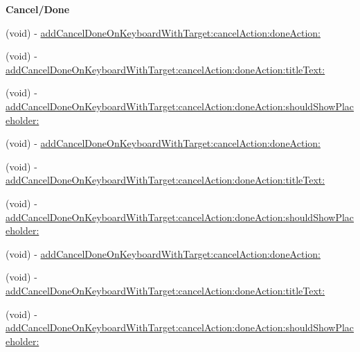 \begin{Indent}\textbf{ Cancel/\+Done}\par
{\em 

 

 }\begin{DoxyCompactItemize}
\item 
(void) -\/ \mbox{\hyperlink{category_u_i_view_07_i_q_toolbar_addition_08_af2a6ff35409164e34fd7dca78b547286}{add\+Cancel\+Done\+On\+Keyboard\+With\+Target\+:cancel\+Action\+:done\+Action\+:}}
\item 
(void) -\/ \mbox{\hyperlink{category_u_i_view_07_i_q_toolbar_addition_08_a5e5bb37dad133e7fa5242eba860e8357}{add\+Cancel\+Done\+On\+Keyboard\+With\+Target\+:cancel\+Action\+:done\+Action\+:title\+Text\+:}}
\item 
(void) -\/ \mbox{\hyperlink{category_u_i_view_07_i_q_toolbar_addition_08_ae2446560790230407bcb9359e055155e}{add\+Cancel\+Done\+On\+Keyboard\+With\+Target\+:cancel\+Action\+:done\+Action\+:should\+Show\+Placeholder\+:}}
\item 
(void) -\/ \mbox{\hyperlink{category_u_i_view_07_i_q_toolbar_addition_08_af2a6ff35409164e34fd7dca78b547286}{add\+Cancel\+Done\+On\+Keyboard\+With\+Target\+:cancel\+Action\+:done\+Action\+:}}
\item 
(void) -\/ \mbox{\hyperlink{category_u_i_view_07_i_q_toolbar_addition_08_a5e5bb37dad133e7fa5242eba860e8357}{add\+Cancel\+Done\+On\+Keyboard\+With\+Target\+:cancel\+Action\+:done\+Action\+:title\+Text\+:}}
\item 
(void) -\/ \mbox{\hyperlink{category_u_i_view_07_i_q_toolbar_addition_08_ae2446560790230407bcb9359e055155e}{add\+Cancel\+Done\+On\+Keyboard\+With\+Target\+:cancel\+Action\+:done\+Action\+:should\+Show\+Placeholder\+:}}
\item 
(void) -\/ \mbox{\hyperlink{category_u_i_view_07_i_q_toolbar_addition_08_af2a6ff35409164e34fd7dca78b547286}{add\+Cancel\+Done\+On\+Keyboard\+With\+Target\+:cancel\+Action\+:done\+Action\+:}}
\item 
(void) -\/ \mbox{\hyperlink{category_u_i_view_07_i_q_toolbar_addition_08_a5e5bb37dad133e7fa5242eba860e8357}{add\+Cancel\+Done\+On\+Keyboard\+With\+Target\+:cancel\+Action\+:done\+Action\+:title\+Text\+:}}
\item 
(void) -\/ \mbox{\hyperlink{category_u_i_view_07_i_q_toolbar_addition_08_ae2446560790230407bcb9359e055155e}{add\+Cancel\+Done\+On\+Keyboard\+With\+Target\+:cancel\+Action\+:done\+Action\+:should\+Show\+Placeholder\+:}}
\end{DoxyCompactItemize}
\end{Indent}
